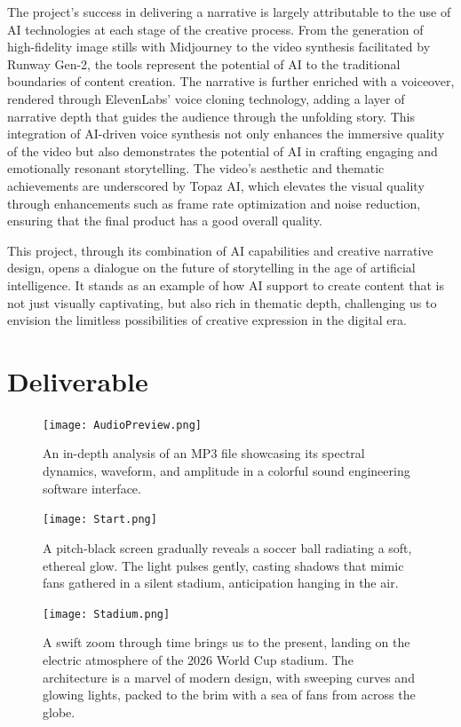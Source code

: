 \documentclass[11pt,a4paper,oneside]{report}
\begin{document}
The project's success in delivering a narrative is largely attributable to the use of AI technologies at each stage of the creative process. 
From the generation of high-fidelity image stills with Midjourney to the video synthesis facilitated by Runway Gen-2, the tools represent the potential of AI to the traditional boundaries of content creation. 
The narrative is further enriched with a voiceover, rendered through ElevenLabs' voice cloning technology, adding a layer of narrative depth that guides the audience through the unfolding story. 
This integration of AI-driven voice synthesis not only enhances the immersive quality of the video but also demonstrates the potential of AI in crafting engaging and emotionally resonant storytelling. 
The video's aesthetic and thematic achievements are underscored by Topaz AI, which elevates the visual quality through enhancements such as frame rate optimization and noise reduction, ensuring that the final product has a good overall quality.

This project, through its combination of AI capabilities and creative narrative design, opens a dialogue on the future of storytelling in the age of artificial intelligence. 
It stands as an example of how AI support to create content that is not just visually captivating, but also rich in thematic depth, challenging us to envision the limitless possibilities of creative expression in the digital era.

\section{Deliverable}

\begin{figure}[htbp]
  \centering
  \texttt{[image: AudioPreview.png]}
  \caption{An in-depth analysis of an MP3 file showcasing its spectral dynamics, waveform, and amplitude in a colorful sound engineering software interface.}
\end{figure}

\begin{figure}[htbp]
  \centering
  \texttt{[image: Start.png]}
  \caption{A pitch-black screen gradually reveals a soccer ball radiating a soft, ethereal glow. The light pulses gently, casting shadows that mimic fans gathered in a silent stadium, anticipation hanging in the air. }
\end{figure}

\begin{figure}[htbp]
  \centering
  \texttt{[image: Stadium.png]}
  \caption{A swift zoom through time brings us to the present, landing on the electric atmosphere of the 2026 World Cup stadium. The architecture is a marvel of modern design, with sweeping curves and glowing lights, packed to the brim with a sea of fans from across the globe. }
\end{figure}
\end{document}

